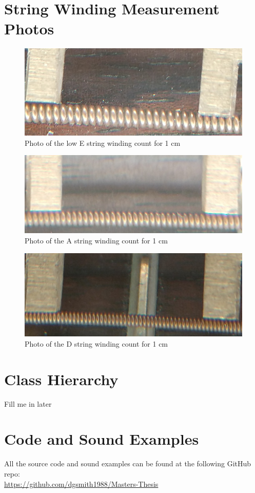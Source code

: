 \documentclass[../main.tex]{subfiles}
\begin{document}
\appendix

\chapter{String Winding Measurement Photos}

\begin{figure}[h]
    \centering
    \includegraphics[scale=.45]{./images/pictures/WindingsEZoom.png}
    \caption{Photo of the low E string winding count for 1 cm}
    \label{fig:EStringWindings}
\end{figure}

\begin{figure}[h]
    \centering
    \includegraphics[scale=.45]{./images/pictures/WindingsAZoom.png}
    \caption{Photo of the A string winding count for 1 cm}
    \label{fig:AStringWindings}
\end{figure}

\begin{figure}[h]
    \centering
    \includegraphics[scale=.5]{./images/pictures/WindingsDZoom.png}
    \caption{Photo of the D string winding count for 1 cm}
    \label{fig:DStringWindings}
\end{figure}

\chapter{Class Hierarchy}
Fill me in later

\chapter{Code and Sound Examples}
All the source code and sound examples can be found at the following GitHub repo:\\
\url{https://github.com/dgsmith1988/Masters-Thesis}
\end{document}
